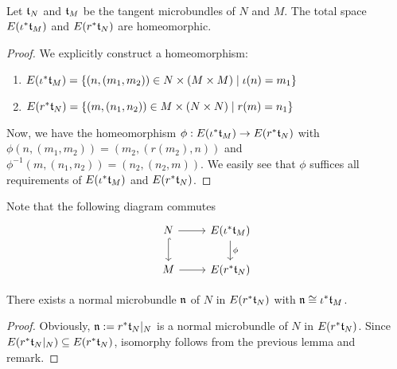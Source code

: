  \\
Let $\mathfrak{t}_N$ and $\mathfrak{t}_M$ be the tangent microbundles of $N$ and $M$.
The total space $E(\iota^*\mathfrak{t}_M)$ and $E(r^*\mathfrak{t}_N)$ are homeomorphic.
\begin{proof}
We explicitly construct a homeomorphism:
\begin{enumerate}
    \item $E(\iota^*\mathfrak{t}_M) = \{ (n, (m_1, m_2)) \in N \times (M \times M) \mid \iota(n) = m_1\}$
    \item $E(r^*\mathfrak{t}_N) = \{ (m, (n_1, n_2)) \in M \times (N \times N) \mid r(m) = n_1\}$
\end{enumerate}
Now, we have the homeomorphism $\phi: E(\iota^*\mathfrak{t}_M) \to E(r^*\mathfrak{t}_N)$ with
$\phi(n, (m_1, m_2)) = (m_2, (r(m_2), n))$ and $\phi^{-1}(m, (n_1, n_2)) = (n_2, (n_2, m))$.
We easily see that $\phi$ suffices all requirements of $E(\iota^*\mathfrak{t}_M)$ and $E(r^*\mathfrak{t}_N)$.
\end{proof}

\begin{remark}
Note that the following diagram commutes
\[\begin{tikzcd}
    N \ar[r] \ar[hookrightarrow]{d} & E(\iota^*\bt_M) \ar[d, "\phi"] \\
    M \ar[r] & E(r^*\bt_N)
\end{tikzcd}\]
\end{remark}

There exists a normal microbundle $\mathfrak{n}$ of $N$ in $E(r^*\mathfrak{t}_N)$ with $\mathfrak{n} \cong \iota^*\mathfrak{t}_M$.
\begin{proof}
Obviously, $\mathfrak{n} := r^*\mathfrak{t}_N \vert_{N}$ is a normal microbundle of $N$ in $E(r^*\mathfrak{t}_N)$.
Since $E(r^*\mathfrak{t}_N \vert_{N}) \subseteq{} E(r^*\mathfrak{t}_N)$, isomorphy follows from the previous lemma and remark.
\end{proof}